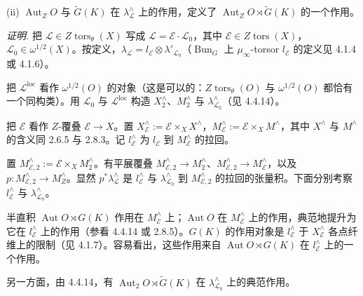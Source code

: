 
(ii) $\operatorname{Aut}_Z O$ 与 $\widetilde{G}(K)$ 在 $\lambda_{\mathcal{L}}^{\wedge}$ 上的作用，定义了 $\operatorname{Aut}_Z O\rtimes\widetilde{G}(K)$ 的一个作用。

\emph{证明.} 把 $\mathcal{L}\in Z\operatorname{tors}_{\theta}(X)$ 写成 $\mathcal{L}=\mathcal{E}\cdot\mathcal{L}_0$，其中 $\mathcal{E}\in Z\operatorname{tors}(X)$，$\mathcal{L}_0\in\omega^{1/2}(X)$。按定义，$\lambda_{\mathcal{L}}=l_{\mathcal{E}}\otimes\lambda'_{\mathcal{L}_0}$（$\operatorname{Bun}_G$ 上 $\mu_\infty$-torsor $l_{\mathcal{E}}$ 的定义见 4.1.4 或 4.1.6）。

把 $\mathcal{L}^{\mathrm{loc}}$ 看作 $\omega^{1/2}(O)$ 的对象（这是可以的：$Z\operatorname{tors}_{\theta}(O)$ 与 $\omega^{1/2}(O)$ 都恰有一个同构类）。用 $\mathcal{L}_0$ 与 $\mathcal{L}^{\mathrm{loc}}$ 构造 $X^{\wedge}_2$、$M^{\wedge}_2$ 与 $\lambda^{\wedge}_{\mathcal{L}_0}$（见 4.4.14）。

把 $\mathcal{E}$ 看作 $Z$-覆叠 $\mathcal{E}\to X$。置 $X^{\wedge}_{\mathcal{E}}:=\mathcal{E}\times_X X^{\wedge}$，$M^{\wedge}_{\mathcal{E}}:=\mathcal{E}\times_X M^{\wedge}$，其中 $X^{\wedge}$ 与 $M^{\wedge}$ 的含义同 2.6.5 与 2.8.3。记 $l^{\wedge}_{\mathcal{E}}$ 为 $l_{\mathcal{E}}$ 到 $M^{\wedge}_{\mathcal{E}}$ 的拉回。

置 $M^{\wedge}_{\mathcal{E},2}:=\mathcal{E}\times_X M^{\wedge}_2$。有平展覆叠 $M^{\wedge}_{\mathcal{E},2}\to M^{\wedge}_2$、$M^{\wedge}_{\mathcal{E},2}\to M^{\wedge}_{\mathcal{E}}$，以及 $p:M^{\wedge}_{\mathcal{E},2}\to M^{\wedge}_Z$。显然 $p^*\lambda^{\wedge}_{\mathcal{L}}$ 是 $l^{\wedge}_{\mathcal{E}}$ 与 $\lambda^{\wedge}_{\mathcal{L}_0}$ 到 $M^{\wedge}_{\mathcal{E},2}$ 的拉回的张量积。下面分别考察 $l^{\wedge}_{\mathcal{E}}$ 与 $\lambda^{\wedge}_{\mathcal{L}_0}$。

半直积 $\operatorname{Aut} O\rtimes G(K)$ 作用在 $M^{\wedge}_{\mathcal{E}}$ 上；$\operatorname{Aut} O$ 在 $M^{\wedge}_{\mathcal{E}}$ 上的作用，典范地提升为它在 $l^{\wedge}_{\mathcal{E}}$ 上的作用（参看 4.4.14 或 2.8.5）。$G(K)$ 的作用对象是 $l^{\wedge}_{\mathcal{E}}$ 于 $X^{\wedge}_{\mathcal{E}}$ 各点纤维上的限制（见 4.1.7）。容易看出，这些作用来自 $\operatorname{Aut} O\rtimes G(K)$ 在 $l^{\wedge}_{\mathcal{E}}$ 上的一个作用。

另一方面，由 4.4.14，有 $\operatorname{Aut}_2 O\rtimes\widetilde{G}(K)$ 在 $\lambda^{\wedge}_{\mathcal{L}_0}$ 上的典范作用。

